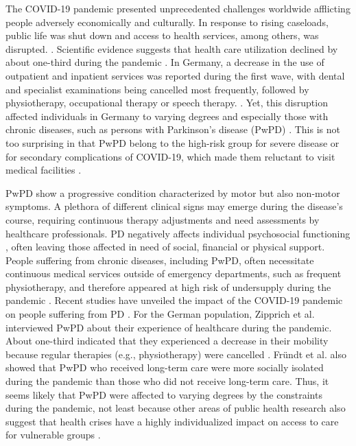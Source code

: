 \documentclass[a4paper,oneside,11pt,english]{scrartcl}
\begin{document}
The \textsc{COVID}-19 pandemic presented unprecedented challenges worldwide afflicting people adversely economically and culturally. In response to rising caseloads, public life was shut down and access to health services, among others, was disrupted. \cite{nunez2021access, moynihan2021impact, world2020impact}. Scientific evidence suggests that health care utilization declined by about one-third during the pandemic \cite{moynihan2021impact}. In Germany, a decrease in the use of outpatient and inpatient services was reported during the first wave, with dental and specialist examinations being cancelled most frequently, followed by physiotherapy, occupational therapy or speech therapy. \cite{Heidemann2022Non-utilisation}. Yet, this disruption affected individuals in Germany to varying degrees and especially those with chronic diseases, such as persons with Parkinson's disease (Pw\textsc{PD}) \cite{kasar2021life,yogev2021covid,scheidt2021care, sepulveda2020impact}. This is not too surprising in that Pw\textsc{PD} belong to the high-risk group for severe disease or for secondary complications of \textsc{COVID}-19, which made them reluctant to visit medical facilities \cite{feral2020collateral}. 

Pw\textsc{PD} show a progressive condition characterized by motor but also non-motor symptoms. A plethora of different clinical signs may emerge during the disease's course, requiring continuous therapy adjustments and need assessments by healthcare professionals. \textsc{PD} negatively affects individual psychosocial functioning \cite{demirtepe2022psychosocial}, often leaving those affected in need of social, financial or physical support. People suffering from chronic diseases, including Pw\textsc{PD}, often necessitate continuous medical services outside of emergency departments, such as frequent physiotherapy, and therefore appeared at high risk of undersupply during the pandemic \cite{scheidt2021care, nunez2021access, world2020impact}. Recent studies have unveiled the impact of the \textsc{COVID}-19 pandemic on people suffering from \textsc{PD} \cite{yogev2021covid, zipprich2020knowledge, frundt2022impact, richter2021analysis, brooks2021social}. For the German population, Zipprich et al. interviewed Pw\textsc{PD} about their experience of healthcare during the pandemic. About one-third indicated that they experienced a decrease in their mobility because regular therapies (e.g., physiotherapy) were cancelled \cite{zipprich2020knowledge}. Fründt et al. also showed that Pw\textsc{PD} who received long-term care were more socially isolated during the pandemic than those who did not receive long-term care. Thus, it seems likely that Pw\textsc{PD} were affected to varying degrees by the constraints during the pandemic, not least because other areas of public health research also suggest that health crises have a highly individualized impact on access to care for vulnerable groups \cite{huijts2017prevalence, lowcock2012social, whocovidbrief}.
\end{document}
